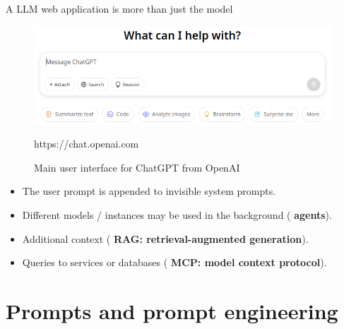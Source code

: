 \documentclass[10pt]{beamer}
\newcommand{\credit}[1]{{\par \raggedleft \scriptsize \mdseries \color{mDarkBrown} #1 \par}}
\newcommand{\feature}[1]{{\color{scLime} \textbf{#1}}}
\begin{document}
\begin{frame}{A LLM web application is more than just the model}
	\begin{figure}
		\includegraphics[width=\textwidth]{figures/OpenAIChatUI.png}
		\caption{Main user interface for ChatGPT from OpenAI}
		\credit{https://chat.openai.com}
	\end{figure}
		\begin{itemize}
			\item The user prompt is appended to invisible system prompts.
			\item Different models / instances may be used in the background (\feature{agents}).
			\item Additional context (\feature{RAG: retrieval-augmented generation}).
			\item Queries to services or databases (\feature{MCP: model context protocol}).
		\end{itemize}
\end{frame}


\section{Prompts and prompt engineering}

\end{document}

